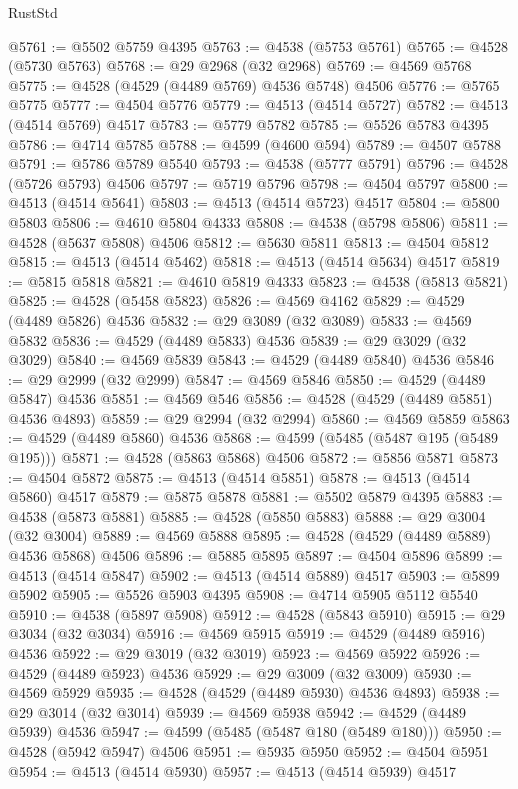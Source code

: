 \begin{lexlean}{RustStd}
\begin{coremodule}
@5761 := @5502 @5759 @4395
@5763 := @4538 (@5753 @5761)
@5765 := @4528 (@5730 @5763)
@5768 := @29 @2968 (@32 @2968)
@5769 := @4569 @5768
@5775 := @4528 (@4529 (@4489 @5769) @4536 @5748) @4506
@5776 := @5765 @5775
@5777 := @4504 @5776
@5779 := @4513 (@4514 @5727)
@5782 := @4513 (@4514 @5769) @4517
@5783 := @5779 @5782
@5785 := @5526 @5783 @4395
@5786 := @4714 @5785
@5788 := @4599 (@4600 @594)
@5789 := @4507 @5788
@5791 := @5786 @5789 @5540
@5793 := @4538 (@5777 @5791)
@5796 := @4528 (@5726 @5793) @4506
@5797 := @5719 @5796
@5798 := @4504 @5797
@5800 := @4513 (@4514 @5641)
@5803 := @4513 (@4514 @5723) @4517
@5804 := @5800 @5803
@5806 := @4610 @5804 @4333
@5808 := @4538 (@5798 @5806)
@5811 := @4528 (@5637 @5808) @4506
@5812 := @5630 @5811
@5813 := @4504 @5812
@5815 := @4513 (@4514 @5462)
@5818 := @4513 (@4514 @5634) @4517
@5819 := @5815 @5818
@5821 := @4610 @5819 @4333
@5823 := @4538 (@5813 @5821)
@5825 := @4528 (@5458 @5823)
@5826 := @4569 @4162
@5829 := @4529 (@4489 @5826) @4536
@5832 := @29 @3089 (@32 @3089)
@5833 := @4569 @5832
@5836 := @4529 (@4489 @5833) @4536
@5839 := @29 @3029 (@32 @3029)
@5840 := @4569 @5839
@5843 := @4529 (@4489 @5840) @4536
@5846 := @29 @2999 (@32 @2999)
@5847 := @4569 @5846
@5850 := @4529 (@4489 @5847) @4536
@5851 := @4569 @546
@5856 := @4528 (@4529 (@4489 @5851) @4536 @4893)
@5859 := @29 @2994 (@32 @2994)
@5860 := @4569 @5859
@5863 := @4529 (@4489 @5860) @4536
@5868 := @4599 (@5485 (@5487 @195 (@5489 @195)))
@5871 := @4528 (@5863 @5868) @4506
@5872 := @5856 @5871
@5873 := @4504 @5872
@5875 := @4513 (@4514 @5851)
@5878 := @4513 (@4514 @5860) @4517
@5879 := @5875 @5878
@5881 := @5502 @5879 @4395
@5883 := @4538 (@5873 @5881)
@5885 := @4528 (@5850 @5883)
@5888 := @29 @3004 (@32 @3004)
@5889 := @4569 @5888
@5895 := @4528 (@4529 (@4489 @5889) @4536 @5868) @4506
@5896 := @5885 @5895
@5897 := @4504 @5896
@5899 := @4513 (@4514 @5847)
@5902 := @4513 (@4514 @5889) @4517
@5903 := @5899 @5902
@5905 := @5526 @5903 @4395
@5908 := @4714 @5905 @5112 @5540
@5910 := @4538 (@5897 @5908)
@5912 := @4528 (@5843 @5910)
@5915 := @29 @3034 (@32 @3034)
@5916 := @4569 @5915
@5919 := @4529 (@4489 @5916) @4536
@5922 := @29 @3019 (@32 @3019)
@5923 := @4569 @5922
@5926 := @4529 (@4489 @5923) @4536
@5929 := @29 @3009 (@32 @3009)
@5930 := @4569 @5929
@5935 := @4528 (@4529 (@4489 @5930) @4536 @4893)
@5938 := @29 @3014 (@32 @3014)
@5939 := @4569 @5938
@5942 := @4529 (@4489 @5939) @4536
@5947 := @4599 (@5485 (@5487 @180 (@5489 @180)))
@5950 := @4528 (@5942 @5947) @4506
@5951 := @5935 @5950
@5952 := @4504 @5951
@5954 := @4513 (@4514 @5930)
@5957 := @4513 (@4514 @5939) @4517

\end{coremodule}
\end{lexlean}
